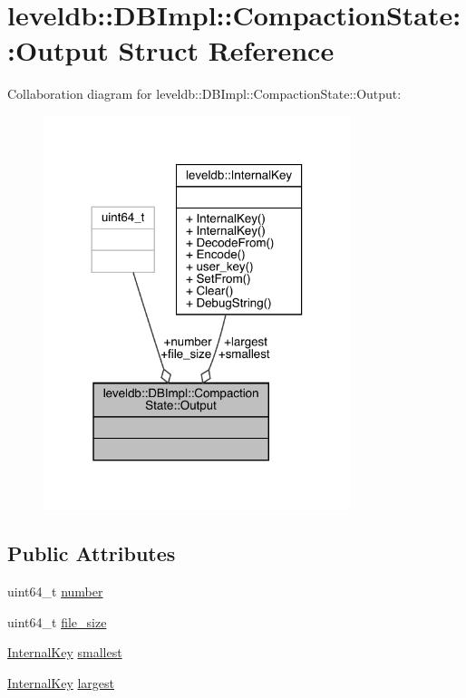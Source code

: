 \hypertarget{structleveldb_1_1_d_b_impl_1_1_compaction_state_1_1_output}{}\section{leveldb\+::D\+B\+Impl\+::Compaction\+State\+::Output Struct Reference}
\label{structleveldb_1_1_d_b_impl_1_1_compaction_state_1_1_output}


Collaboration diagram for leveldb\+::D\+B\+Impl\+::Compaction\+State\+::Output\+:
\nopagebreak
\begin{figure}[H]
\begin{center}
\leavevmode
\includegraphics[width=254pt]{structleveldb_1_1_d_b_impl_1_1_compaction_state_1_1_output__coll__graph}
\end{center}
\end{figure}
\subsection*{Public Attributes}
\begin{DoxyCompactItemize}
\item 
uint64\+\_\+t \mbox{\hyperlink{structleveldb_1_1_d_b_impl_1_1_compaction_state_1_1_output_aa4b759dca2a83bdb8d9edbf7e2d213e2}{number}}
\item 
uint64\+\_\+t \mbox{\hyperlink{structleveldb_1_1_d_b_impl_1_1_compaction_state_1_1_output_a37906cee65a9d1873b7b7a4169f22402}{file\+\_\+size}}
\item 
\mbox{\hyperlink{classleveldb_1_1_internal_key}{Internal\+Key}} \mbox{\hyperlink{structleveldb_1_1_d_b_impl_1_1_compaction_state_1_1_output_a88ada857d0cf32ae8e76d7baf4e80c69}{smallest}}
\item 
\mbox{\hyperlink{classleveldb_1_1_internal_key}{Internal\+Key}} \mbox{\hyperlink{structleveldb_1_1_d_b_impl_1_1_compaction_state_1_1_output_a6e257f231aba82d20cb7199a552b2a63}{largest}}
\end{DoxyCompactItemize}


